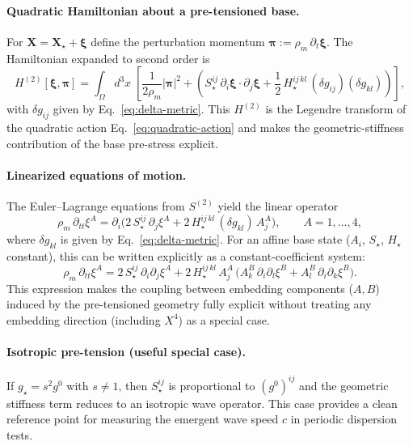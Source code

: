 \paragraph{Quadratic Hamiltonian about a pre-tensioned base.}
For $\mathbf X=\mathbf X_\star+\boldsymbol\xi$ define the perturbation momentum
$\boldsymbol\pi := \rho_m\,\partial_t\boldsymbol\xi$.
The Hamiltonian expanded to second order is
\begin{equation}
  H^{(2)}[\boldsymbol\xi,\boldsymbol\pi]
  =
  \int_{\Omega} d^3x\;
  \left[
    \frac{1}{2\rho_m}|\boldsymbol\pi|^2
    +
    \left(
      S_\star^{ij}\,\partial_i\boldsymbol\xi\cdot\partial_j\boldsymbol\xi
      +
      \frac12\,H_\star^{ij\,kl}\,(\delta g_{ij})(\delta g_{kl})
    \right)
  \right],
  \label{eq:quadratic-hamiltonian}
\end{equation}
with $\delta g_{ij}$ given by Eq.~\eqref{eq:delta-metric}.
This $H^{(2)}$ is the Legendre transform of the quadratic action
Eq.~\eqref{eq:quadratic-action} and makes the geometric-stiffness contribution of the base pre-stress explicit.

\paragraph{Linearized equations of motion.}
The Euler--Lagrange equations from $S^{(2)}$ yield the linear operator
\begin{equation}
  \rho_m\,\partial_{tt}\xi^A
  =
  \partial_i\Big(
    2\,S_\star^{ij}\,\partial_j\xi^A
    +
    2\,H_\star^{ij\,kl}\,(\delta g_{kl})\,A_j^A
  \Big),
  \qquad A=1,\dots,4,
  \label{eq:linearized-pde-general}
\end{equation}
where $\delta g_{kl}$ is given by Eq.~\eqref{eq:delta-metric}. For an affine base state
($A_i$, $S_\star$, $H_\star$ constant), this can be written explicitly as a constant-coefficient system:
\begin{equation}
  \rho_m\,\partial_{tt}\xi^A
  =
  2\,S_\star^{ij}\,\partial_i\partial_j\xi^A
  +
  2\,H_\star^{ij\,kl}\,A_j^A\,
  \Big(
    A_k^B\,\partial_i\partial_l\xi^B + A_l^B\,\partial_i\partial_k\xi^B
  \Big).
  \label{eq:linearized-pde-constant-coeff}
\end{equation}
This expression makes the coupling between embedding components ($A,B$) induced by the pre-tensioned geometry fully explicit
without treating any embedding direction (including $X^4$) as a special case.

\paragraph{Isotropic pre-tension (useful special case).}
If $g_\star=s^2 g^0$ with $s\neq 1$, then $S_\star^{ij}$ is proportional to $(g^0)^{ij}$
and the geometric stiffness term reduces to an isotropic wave operator.
This case provides a clean reference point for measuring the emergent wave speed $c$ in periodic dispersion tests.

